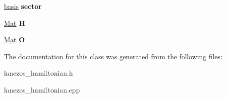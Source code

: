 \begin{DoxyCompactItemize}
\item 
\hyperlink{classbasis}{basis} {\bfseries sector}\hypertarget{classlhamil_a3a5ef09836b4d5a13a6ff3aa62c67036}{}\label{classlhamil_a3a5ef09836b4d5a13a6ff3aa62c67036}

\item 
\hyperlink{classMat}{Mat} {\bfseries H}\hypertarget{classlhamil_af5eb4f55cd465808850890273b07d16a}{}\label{classlhamil_af5eb4f55cd465808850890273b07d16a}

\item 
\hyperlink{classMat}{Mat} {\bfseries O}\hypertarget{classlhamil_afa93e49df6f87889602b9fd4e84c511f}{}\label{classlhamil_afa93e49df6f87889602b9fd4e84c511f}

\end{DoxyCompactItemize}


The documentation for this class was generated from the following files\+:\begin{DoxyCompactItemize}
\item 
lanczos\+\_\+hamiltonian.\+h\item 
lanczos\+\_\+hamiltonian.\+cpp\end{DoxyCompactItemize}
